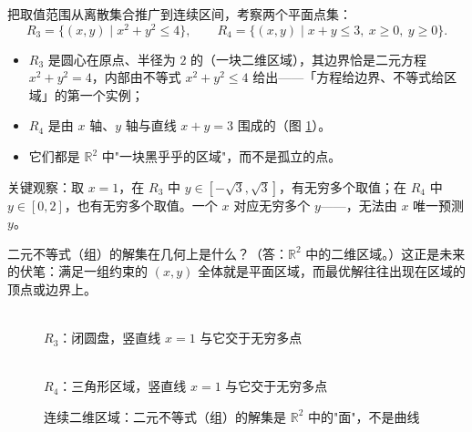 \begin{explore}
把取值范围从离散集合推广到连续区间，考察两个平面点集：
\[
  R_3=\{(x,y)\mid x^2+y^2\leq4\},\qquad
  R_4=\{(x,y)\mid x+y\leq3,\ x\geq0,\ y\geq0\}.
\]
\begin{itemize}
  \item $R_3$ 是圆心在原点、半径为 $2$ 的（一块二维区域），其边界恰是二元方程 $x^2+y^2=4$，内部由不等式 $x^2+y^2\leq4$ 给出——「方程给边界、不等式给区域」的第一个实例；
  \item $R_4$ 是由 $x$ 轴、$y$ 轴与直线 $x+y=3$ 围成的（图 \ref{fig:region}）。
  \item 它们都是 $\mathbb{R}^2$ 中"一块黑乎乎的区域"，而不是孤立的点。
\end{itemize}

关键观察：取 $x=1$，在 $R_3$ 中 $y\in[-\sqrt3,\sqrt3]$，有无穷多个取值；在 $R_4$ 中 $y\in[0,2]$，也有无穷多个取值。一个 $x$ 对应无穷多个 $y$——，无法由 $x$ 唯一预测 $y$。

二元不等式（组）的解集在几何上是什么？（答：$\mathbb{R}^2$ 中的二维区域。）这正是未来的伏笔：满足一组约束的 $(x,y)$ 全体就是平面区域，而最优解往往出现在区域的顶点或边界上。

\begin{figure}[htbp]
  \centering
  \begin{minipage}{0.48\textwidth}
    \centering
    \\[2pt]{\footnotesize $R_3$：闭圆盘，竖直线 $x=1$ 与它交于无穷多点}
  \end{minipage}\hfill
  \begin{minipage}{0.48\textwidth}
    \centering
    \\[2pt]{\footnotesize $R_4$：三角形区域，竖直线 $x=1$ 与它交于无穷多点}
  \end{minipage}
  \caption{连续二维区域：二元不等式（组）的解集是 $\mathbb{R}^2$ 中的"面"，不是曲线}
  \label{fig:region}
\end{figure}


\end{explore}
